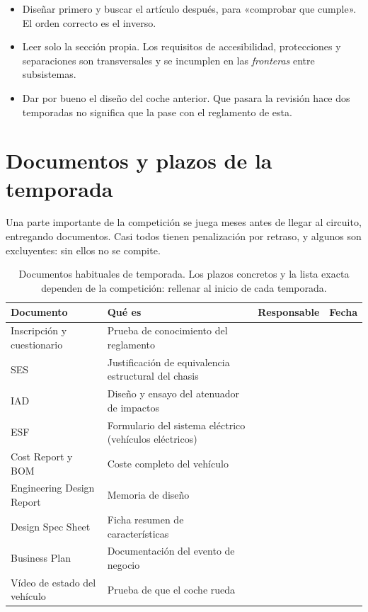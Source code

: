 \begin{ojo}
\begin{itemize}
  \item Diseñar primero y buscar el artículo después, para «comprobar que
        cumple». El orden correcto es el inverso.
  \item Leer solo la sección propia. Los requisitos de accesibilidad,
        protecciones y separaciones son transversales y se incumplen en las
        \emph{fronteras} entre subsistemas.
  \item Dar por bueno el diseño del coche anterior. Que pasara la revisión hace
        dos temporadas no significa que la pase con el reglamento de esta.
\end{itemize}
\end{ojo}

\section{Documentos y plazos de la temporada}
\label{sec:formula_student:04}

Una parte importante de la competición se juega meses antes de llegar al
circuito, entregando documentos. Casi todos tienen penalización por retraso, y
algunos son excluyentes: sin ellos no se compite.

\begin{table}[H]
\centering
\caption{Documentos habituales de temporada. Los plazos concretos y la lista
exacta dependen de la competición: rellenar al inicio de cada temporada.}
\label{tab:documentos_temporada}
\begin{tabularx}{\textwidth}{@{}lXll@{}}
\toprule
\textbf{Documento} & \textbf{Qué es} & \textbf{Responsable} & \textbf{Fecha} \\
\midrule
Inscripción y cuestionario & Prueba de conocimiento del reglamento & & \\
SES & Justificación de equivalencia estructural del chasis & & \\
IAD & Diseño y ensayo del atenuador de impactos & & \\
ESF & Formulario del sistema eléctrico (vehículos eléctricos) & & \\
Cost Report y BOM & Coste completo del vehículo & & \\
Engineering Design Report & Memoria de diseño & & \\
Design Spec Sheet & Ficha resumen de características & & \\
Business Plan & Documentación del evento de negocio & & \\
Vídeo de estado del vehículo & Prueba de que el coche rueda & & \\
\bottomrule
\end{tabularx}
\end{table}

